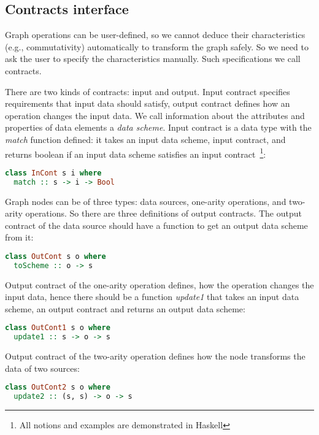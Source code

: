 \subsection{Contracts interface}

Graph operations can be user-defined, so we cannot deduce their characteristics (e.g., commutativity) automatically to transform the graph safely.
So we need to ask the user to specify the characteristics manually.
Such specifications we call contracts.

There are two kinds of contracts: input and output.
Input contract specifies requirements that input data should satisfy, output contract defines how an operation changes the input data.
We call information about the attributes and properties of data elements a {\em data scheme}.
Input contract is a data type with the {\em match} function defined: it takes an input data scheme, input contract, and returns boolean if an input data scheme satisfies an input contract~\footnote{All notions and examples are demonstrated in Haskell}:

\begin{lstlisting}[language=Haskell]
class InCont s i where
  match :: s -> i -> Bool
\end{lstlisting}

Graph nodes can be of three types: data sources, one-arity operations, and two-arity operations.
So there are three definitions of output contracts.
The output contract of the data source should have a function to get an output data scheme from it:

\begin{lstlisting}[language=Haskell]
class OutCont s o where
  toScheme :: o -> s
\end{lstlisting}

Output contract of the one-arity operation defines, how the operation changes the input data, hence there should be a function {\em update1} that takes an input data scheme, an output contract and returns an output data scheme:

\begin{lstlisting}[language=Haskell]
class OutCont1 s o where
  update1 :: s -> o -> s
\end{lstlisting}

Output contract of the two-arity operation defines how the node transforms the data of two sources:

\begin{lstlisting}[language=Haskell]
class OutCont2 s o where
  update2 :: (s, s) -> o -> s
\end{lstlisting}

